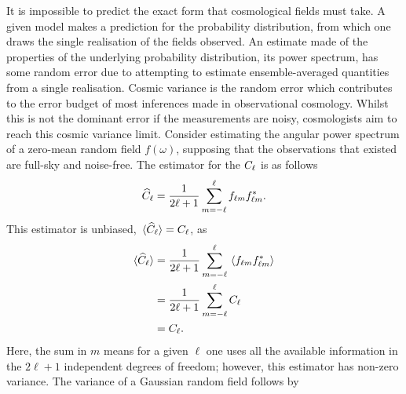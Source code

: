 It is impossible to predict the exact form that cosmological fields must take.
A given model makes a prediction for the probability distribution, from which one draws the single realisation of the fields observed.
An estimate made of the properties of the underlying probability distribution, \ie{} its power spectrum, has some random error due to attempting to estimate ensemble-averaged quantities from a single realisation.
Cosmic variance is the random error which contributes to the error budget of most inferences made in observational cosmology.
Whilst this is not the dominant error if the measurements are noisy, cosmologists aim to reach this cosmic variance limit.
Consider estimating the angular power spectrum of a zero-mean random field \(f(\omega)\), supposing that the observations that existed are full-sky and noise-free.
The estimator for the \(C_{\ell}{}\) is as follows
%
\begin{equation}
	\widehat{C}_{\ell}
	= \frac{1}{2\ell+1} \sum\limits_{m=-\ell}^{\ell} {f}_{\ell m} {f}_{\ell m}^{\ast}.
\end{equation}
%
This estimator is unbiased, \ie{} \(\expval*{\widehat{C}_{\ell}} = C_{\ell}{}\), as
%
\begin{align}
	\expval*{\widehat{C}_{\ell}}
	 & = \frac{1}{2\ell+1} \sum\limits_{m=-\ell}^{\ell} \expval*{{f}_{\ell m} {f}_{\ell m}^{\ast}} \nonumber{} \\
	 & = \frac{1}{2\ell+1} \sum\limits_{m=-\ell}^{\ell} C_{\ell} \nonumber{}                             \\
	 & = C_{\ell}.
\end{align}
%
Here, the sum in \(m\) means for a given \(\ell{}\) one uses all the available information in the \(2\ell+1\) independent degrees of freedom; however, this estimator has non-zero variance.
The variance of a Gaussian random field follows by
%
